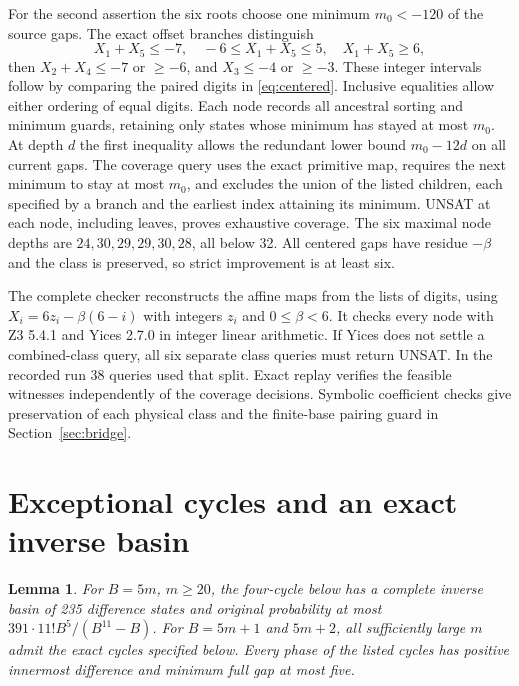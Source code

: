 \documentclass[11pt,reqno]{amsart}
\newtheorem{lemma}[theorem]{Lemma}
\theoremstyle{remark}
\begin{document}
For the second assertion the six roots choose one minimum \(m_0<-120\) of the source gaps. The exact offset branches distinguish
\[
 X_1+X_5\le-7,\quad -6\le X_1+X_5\le5,\quad X_1+X_5\ge6,
\]
then \(X_2+X_4\le-7\) or \(\ge-6\), and \(X_3\le-4\) or \(\ge-3\). These integer intervals follow by comparing the paired digits in \eqref{eq:centered}. Inclusive equalities allow either ordering of equal digits. Each node records all ancestral sorting and minimum guards, retaining only states whose minimum has stayed at most \(m_0\). At depth \(d\) the first inequality allows the redundant lower bound \(m_0-12d\) on all current gaps. The coverage query uses the exact primitive map, requires the next minimum to stay at most \(m_0\), and excludes the union of the listed children, each specified by a branch and the earliest index attaining its minimum. UNSAT at each node, including leaves, proves exhaustive coverage. The six maximal node depths are \(24,30,29,29,30,28\), all below 32. All centered gaps have residue \(-\beta\) and the class is preserved, so strict improvement is at least six.

The complete checker reconstructs the affine maps from the lists of digits, using \(X_i=6z_i-\beta(6-i)\) with integers \(z_i\) and \(0\le\beta<6\). It checks every node with Z3 5.4.1 and Yices 2.7.0 in integer linear arithmetic. If Yices does not settle a combined-class query, all six separate class queries must return UNSAT. In the recorded run 38 queries used that split. Exact replay verifies the feasible witnesses independently of the coverage decisions. Symbolic coefficient checks give preservation of each physical class and the finite-base pairing guard in Section~\ref{sec:bridge}.

\section{Exceptional cycles and an exact inverse basin}\label{ap:cycles}

\begin{lemma}\label{lem:cycles}
For \(B=5m\), \(m\ge20\), the four-cycle below has a complete inverse basin of 235 difference states and original probability at most \(391\cdot11! B^5/(B^{11}-B)\). For \(B=5m+1\) and \(5m+2\), all sufficiently large \(m\) admit the exact cycles specified below. Every phase of the listed cycles has positive innermost difference and minimum full gap at most five.
\end{lemma}
\end{document}
